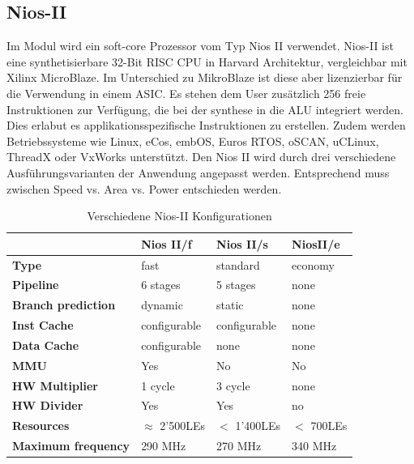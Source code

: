 \subsection{Nios-II}
Im Modul wird ein soft-core Prozessor vom Typ Nios II verwendet. Nios-II ist eine synthetisierbare 32-Bit RISC CPU in Harvard Architektur, vergleichbar mit Xilinx MicroBlaze. Im Unterschied zu MikroBlaze ist diese aber lizenzierbar für die Verwendung in einem ASIC. Es stehen dem User zusätzlich 256 freie Instruktionen zur Verfügung, die bei der synthese in die ALU integriert werden. Dies erlabut es applikationsspezifische Instruktionen zu erstellen. Zudem werden Betriebssysteme wie Linux, eCos, embOS, Euros RTOS, oSCAN, uCLinux, ThreadX oder VxWorks unterstützt. Den Nios II wird durch drei verschiedene Ausführungsvarianten der Anwendung angepasst werden. Entsprechend muss zwischen Speed vs. Area vs. Power entschieden werden.
\begin{table}[h!]
\begin{center}
\begin{tabular}{l|l|l|l}
 & Nios II/f & Nios II/s & NiosII/e \\
 \hline
 \textbf{Type} & fast & standard & economy \\
 \textbf{Pipeline} & 6 stages & 5 stages & none\\
 \textbf{Branch prediction} & dynamic & static &none\\
 \textbf{Inst Cache} & configurable & configurable & none\\
 \textbf{Data Cache} & configurable & none & none\\
 \textbf{MMU} & Yes & No & No\\
 \textbf{HW Multiplier} &1 cycle & 3 cycle & none\\
 \textbf{HW Divider} & Yes & Yes & no\\
 \textbf{Resources} & $\approx$ 2'500LEs & $<$ 1'400LEs & $<$ 700LEs \\
 \textbf{Maximum frequency} & 290 MHz & 270 MHz & 340 MHz\\
\end{tabular}
\caption{Verschiedene Nios-II Konfigurationen}
\end{center}
\end{table}
